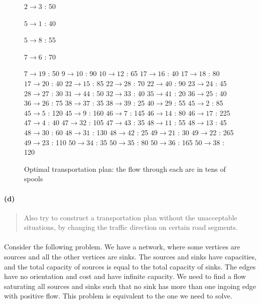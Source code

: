 \begin{figure}[H]
\centering
\begin{multicols}{5}
$ 2 \rightarrow 3 $ : 50

$ 5 \rightarrow 1 $ : 40

$ 5 \rightarrow 8 $ : 55

$ 7 \rightarrow 6 $ : 70

$ 7 \rightarrow 19 $ : 50
$ 9 \rightarrow 10 $ : 90
$ 10 \rightarrow 12 $ : 65
$ 17 \rightarrow 16 $ : 40
$ 17 \rightarrow 18 $ : 80
$ 17 \rightarrow 20 $ : 40
$ 22 \rightarrow 15 $ : 85
$ 22 \rightarrow 28 $ : 70
$ 22 \rightarrow 40 $ : 90
$ 23 \rightarrow 24 $ : 45
$ 28 \rightarrow 27 $ : 30
$ 31 \rightarrow 44 $ : 50
$ 32 \rightarrow 33 $ : 40
$ 35 \rightarrow 41 $ : 20
$ 36 \rightarrow 25 $ : 40
$ 36 \rightarrow 26 $ : 75
$ 38 \rightarrow 37 $ : 35
$ 38 \rightarrow 39 $ : 25
$ 40 \rightarrow 29 $ : 55
$ 45 \rightarrow 2 $ : 85
$ 45 \rightarrow 5 $ : 120
$ 45 \rightarrow 9 $ : 160
$ 46 \rightarrow 7 $ : 145
$ 46 \rightarrow 14 $ : 80
$ 46 \rightarrow 17 $ : 225
$ 47 \rightarrow 4 $ : 40
$ 47 \rightarrow 32 $ : 105
$ 47 \rightarrow 43 $ : 35
$ 48 \rightarrow 11 $ : 55
$ 48 \rightarrow 13 $ : 45
$ 48 \rightarrow 30 $ : 60
$ 48 \rightarrow 31 $ : 130
$ 48 \rightarrow 42 $ : 25
$ 49 \rightarrow 21 $ : 30
$ 49 \rightarrow 22 $ : 265
$ 49 \rightarrow 23 $ : 110
$ 50 \rightarrow 34 $ : 35
$ 50 \rightarrow 35 $ : 80
$ 50 \rightarrow 36 $ : 165
$ 50 \rightarrow 38 $ : 120
\end{multicols}
\caption{Optimal transportation plan: the flow through each arc in tens of spools}
\label{flow3-2c}
\end{figure}

\paragraph{(d)}
\begin{quote}
Also try to construct a transportation plan without the unacceptable situations, by changing the traffic direction on certain road segments.
\end{quote}

\paragraph{}
Consider the following problem. We have a network, where some vertices are sources and all the other vertices are sinks. The sources and sinks have capacities, and the total capacity of sources is equal to the total capacity of sinks. The edges have no orientation and cost and have infinite capacity. We need to find a flow saturating all sources and sinks such that no sink has more than one ingoing edge with positive flow. This problem is equivalent to the one we need to solve.

